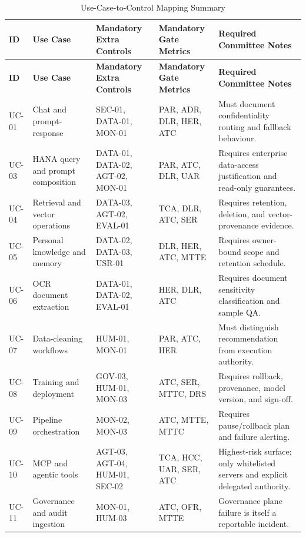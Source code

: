 \documentclass[11pt,a4paper]{article}
\begin{document}
\begin{longtable}{P{0.08\textwidth}P{0.22\textwidth}P{0.18\textwidth}P{0.20\textwidth}P{0.20\textwidth}}
\caption{Use-Case-to-Control Mapping Summary} \\
\toprule
\textbf{ID} & \textbf{Use Case} & \textbf{Mandatory Extra Controls} & \textbf{Mandatory Gate Metrics} & \textbf{Required Committee Notes} \\
\midrule
\endfirsthead
\toprule
\textbf{ID} & \textbf{Use Case} & \textbf{Mandatory Extra Controls} & \textbf{Mandatory Gate Metrics} & \textbf{Required Committee Notes} \\
\midrule
\endhead
UC-01 & Chat and prompt-response & SEC-01, DATA-01, MON-01 & PAR, ADR, DLR, HER, ATC & Must document confidentiality routing and fallback behaviour. \\
UC-03 & HANA query and prompt composition & DATA-01, DATA-02, AGT-02, MON-01 & PAR, ATC, DLR, UAR & Requires enterprise data-access justification and read-only guarantees. \\
UC-04 & Retrieval and vector operations & DATA-03, AGT-02, EVAL-01 & TCA, DLR, ATC, SER & Requires retention, deletion, and vector-provenance evidence. \\
UC-05 & Personal knowledge and memory & DATA-02, DATA-03, USR-01 & DLR, HER, ATC, MTTE & Requires owner-bound scope and retention schedule. \\
UC-06 & OCR document extraction & DATA-01, DATA-02, EVAL-01 & HER, DLR, ATC & Requires document sensitivity classification and sample QA. \\
UC-07 & Data-cleaning workflows & HUM-01, MON-01 & PAR, ATC, HER & Must distinguish recommendation from execution authority. \\
UC-08 & Training and deployment & GOV-03, HUM-01, MON-03 & ATC, SER, MTTC, DRS & Requires rollback, provenance, model version, and sign-off. \\
UC-09 & Pipeline orchestration & MON-02, MON-03 & ATC, MTTE, MTTC & Requires pause/rollback plan and failure alerting. \\
UC-10 & MCP and agentic tools & AGT-03, AGT-04, HUM-01, SEC-02 & TCA, HCC, UAR, SER, ATC & Highest-risk surface; only whitelisted servers and explicit delegated authority. \\
UC-11 & Governance and audit ingestion & MON-01, HUM-03 & ATC, OFR, MTTE & Governance plane failure is itself a reportable incident. \\
\bottomrule
\end{longtable}
\end{document}
